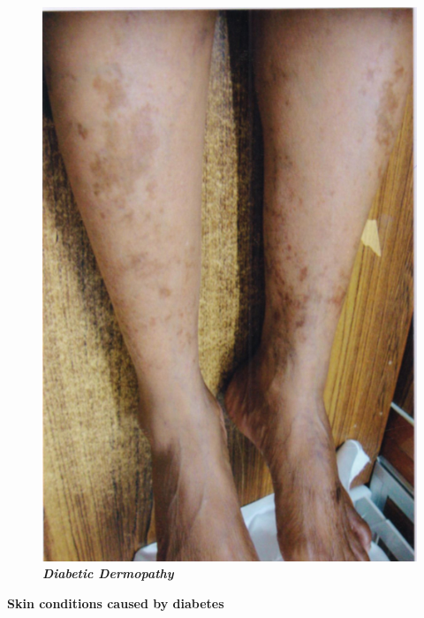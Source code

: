 \begin{figure}[h]
\centering
\includegraphics[scale=1.3]{images/072.jpg}\\
\textbf{\textit{Diabetic Dermopathy}}
\end{figure}

\textbf{Skin conditions caused by diabetes}

